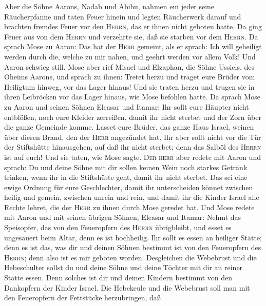  Aber die Söhne Aarons, Nadab und Abihu, nahmen ein jeder
seine Räucherpfanne und taten Feuer hinein und legten Räucherwerk darauf
und brachten fremdes Feuer vor den \textsc{Herrn}, das er ihnen nicht
geboten hatte.  Da ging Feuer aus von dem \textsc{Herrn}
und verzehrte sie, daß sie starben vor dem \textsc{Herrn}.
 Da sprach Mose zu Aaron: Das hat der \textsc{Herr}
gemeint, als er sprach: Ich will geheiligt werden durch die, welche zu
mir nahen, und geehrt werden vor allem Volk! Und Aaron schwieg still.
 Mose aber rief Misael und Elzaphan, die Söhne Ussiels,
des Oheims Aarons, und sprach zu ihnen: Tretet herzu und traget eure
Brüder vom Heiligtum hinweg, vor das Lager hinaus!  Und
sie traten herzu und trugen sie in ihren Leibröcken vor das Lager
hinaus, wie Mose befohlen hatte.  Da sprach Mose zu Aaron
und seinen Söhnen Eleasar und Itamar: Ihr sollt eure Häupter nicht
entblößen, noch eure Kleider zerreißen, damit ihr nicht sterbet und der
Zorn über die ganze Gemeinde komme. Lasset eure Brüder, das ganze Haus
Israel, weinen über diesen Brand, den der \textsc{Herr} angezündet hat.
 Ihr aber sollt nicht vor die Tür der Stiftshütte
hinausgehen, auf daß ihr nicht sterbet; denn das Salböl des
\textsc{Herrn} ist auf euch! Und sie taten, wie Mose sagte.
 \textsc{Der herr} aber redete mit Aaron und sprach:
 Du und deine Söhne mit dir sollen keinen Wein noch
starkes Getränk trinken, wenn ihr in die Stiftshütte geht, damit ihr
nicht sterbet. Das sei eine ewige Ordnung für eure Geschlechter,
 damit ihr unterscheiden könnet zwischen heilig und
gemein, zwischen unrein und rein,  und damit ihr die
Kinder Israel alle Rechte lehret, die der \textsc{Herr} zu ihnen durch
Mose geredet hat.  Und Mose redete mit Aaron und mit
seinen übrigen Söhnen, Eleasar und Itamar: Nehmt das Speisopfer, das von
den Feueropfern des \textsc{Herrn} übrigbleibt, und esset es ungesäuert
beim Altar, denn es ist hochheilig.  Ihr sollt es essen
an heiliger Stätte; denn es ist das, was dir und deinen Söhnen bestimmt
ist von den Feueropfern des \textsc{Herrn}; denn also ist es mir geboten
worden.  Desgleichen die Webebrust und die Hebeschulter
sollst du und deine Söhne und deine Töchter mit dir an reiner Stätte
essen. Denn solches ist dir und deinen Kindern bestimmt von den
Dankopfern der Kinder Israel.  Die Hebekeule und die
Webebrust soll man mit den Feueropfern der Fettstücke herzubringen, daß
